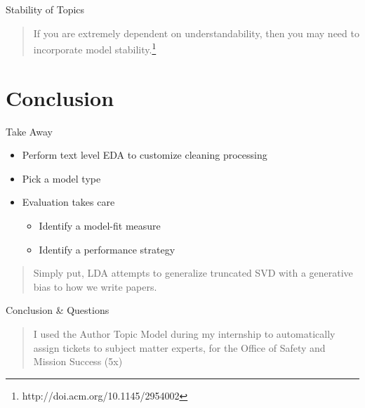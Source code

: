 \documentclass[10pt]{beamer}
\begin{document}
\begin{frame}{Stability of Topics}
  \begin{quote}
    If you are extremely dependent on understandability, then you may need to incorporate model stability.\footnote{http://doi.acm.org/10.1145/2954002}
  \end{quote}
\end{frame}

\section{Conclusion}

\begin{frame}{Take Away}

\begin{itemize}
\item Perform text level EDA to customize cleaning processing
\item Pick a model type
\item Evaluation takes care
  \begin{itemize}
  \item Identify a model-fit measure
  \item Identify a performance strategy
  \end{itemize}
\end{itemize}

\vspace{2em}

\begin{quote}
Simply put, LDA attempts to generalize truncated SVD with a generative bias to how we write papers.
\end{quote}
\end{frame}


\begin{frame}{Conclusion \& Questions}

  \begin{quote}
    I used the Author Topic Model during my internship to automatically assign tickets to subject matter experts, for the Office of Safety and Mission Success (5x)
  \end{quote}

\end{frame}
\end{document}
